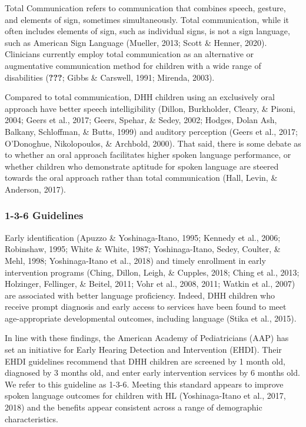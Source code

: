 \documentclass[english,man]{apa6}
\begin{document}
Total Communication refers to communication that combines speech, gesture, and elements of sign, sometimes simultaneously. Total communication, while it often includes elements of sign, such as individual signs, is not a sign language, such as American Sign Language (Mueller, 2013; Scott \& Henner, 2020). Clinicians currently employ total communication as an alternative or augmentative communication method for children with a wide range of disabilities ({\textbf{???}}; Gibbs \& Carswell, 1991; Mirenda, 2003).

Compared to total communication, DHH children using an exclusively oral approach have better speech intelligibility (Dillon, Burkholder, Cleary, \& Pisoni, 2004; Geers et al., 2017; Geers, Spehar, \& Sedey, 2002; Hodges, Dolan Ash, Balkany, Schloffman, \& Butts, 1999) and auditory perception (Geers et al., 2017; O'Donoghue, Nikolopoulos, \& Archbold, 2000). That said, there is some debate as to whether an oral approach facilitates higher spoken language performance, or whether children who demonstrate aptitude for spoken language are steered towards the oral approach rather than total communication (Hall, Levin, \& Anderson, 2017).

\hypertarget{guidelines}{%
\subsubsection{1-3-6 Guidelines}\label{guidelines}}

Early identification (Apuzzo \& Yoshinaga-Itano, 1995; Kennedy et al., 2006; Robinshaw, 1995; White \& White, 1987; Yoshinaga-Itano, Sedey, Coulter, \& Mehl, 1998; Yoshinaga-Itano et al., 2018) and timely enrollment in early intervention programs (Ching, Dillon, Leigh, \& Cupples, 2018; Ching et al., 2013; Holzinger, Fellinger, \& Beitel, 2011; Vohr et al., 2008, 2011; Watkin et al., 2007) are associated with better language proficiency. Indeed, DHH children who receive prompt diagnosis and early access to services have been found to meet age-appropriate developmental outcomes, including language (Stika et al., 2015).

In line with these findings, the American Academy of Pediatricians (AAP) has set an initiative for Early Hearing Detection and Intervention (EHDI). Their EHDI guidelines recommend that DHH children are screened by 1 month old, diagnosed by 3 months old, and enter early intervention services by 6 months old. We refer to this guideline as 1-3-6. Meeting this standard appears to improve spoken language outcomes for children with HL (Yoshinaga-Itano et al., 2017, 2018) and the benefits appear consistent across a range of demographic characteristics.
\end{document}
